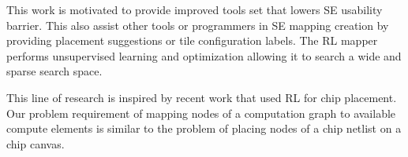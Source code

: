 This work is motivated to provide improved tools set that lowers SE usability barrier. This also assist other tools or programmers in SE mapping creation by providing placement suggestions or tile 
configuration labels. The RL mapper performs unsupervised learning and optimization allowing it to search a wide and sparse search space. 

This line of research is inspired by recent work that used RL for chip placement. 
Our problem requirement of mapping nodes of a computation graph to available compute elements is similar to the problem of placing nodes of a chip netlist on a chip canvas. 